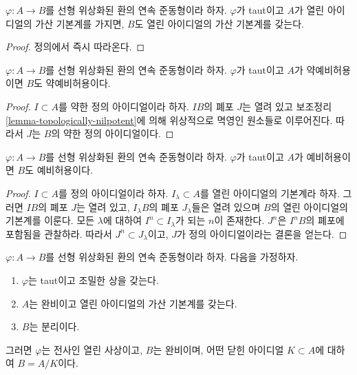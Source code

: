 \begin{lemma}
\label{lemma-taut-ascent-countable}
$\varphi : A \to B$를 선형 위상화된 환의 연속 준동형이라 하자.
$\varphi$가 taut이고 $A$가 열린 아이디얼의 가산 기본계를 가지면,
$B$도 열린 아이디얼의 가산 기본계를 갖는다.
\end{lemma}

\begin{proof}
정의에서 즉시 따라온다.
\end{proof}

\begin{lemma}
\label{lemma-taut-ascent-weakly-admissible}
$\varphi : A \to B$를 선형 위상화된 환의 연속 준동형이라 하자.
$\varphi$가 taut이고 $A$가 약예비허용이면 $B$도 약예비허용이다.
\end{lemma}

\begin{proof}
$I \subset A$를 약한 정의 아이디얼이라 하자. $IB$의 폐포 $J$는
열려 있고 보조정리 \ref{lemma-topologically-nilpotent}에 의해
위상적으로 멱영인 원소들로 이루어진다. 따라서 $J$는 $B$의 약한
정의 아이디얼이다.
\end{proof}

\begin{lemma}
\label{lemma-taut-ascent-admissible}
$\varphi : A \to B$를 선형 위상화된 환의 연속 준동형이라 하자.
$\varphi$가 taut이고 $A$가 예비허용이면 $B$도 예비허용이다.
\end{lemma}

\begin{proof}
$I \subset A$를 정의 아이디얼이라 하자. $I_\lambda \subset A$를
열린 아이디얼의 기본계라 하자. 그러면 $IB$의 폐포 $J$는 열려 있고,
$I_\lambda B$의 폐포 $J_\lambda$들은 열려 있으며 $B$의 열린
아이디얼의 기본계를 이룬다. 모든 $\lambda$에 대하여
$I^n \subset I_\lambda$가 되는 $n$이 존재한다. $J^n$은 $I^nB$의
폐포에 포함됨을 관찰하라. 따라서 $J^n \subset J_\lambda$이고,
$J$가 정의 아이디얼이라는 결론을 얻는다.
\end{proof}

\begin{lemma}
\label{lemma-dense-image-surjective}
$\varphi : A \to B$를 선형 위상화된 환의 연속 준동형이라 하자.
다음을 가정하자.
\begin{enumerate}
\item $\varphi$는 taut이고 조밀한 상을 갖는다.
\item $A$는 완비이고 열린 아이디얼의 가산 기본계를 갖는다.
\item $B$는 분리이다.
\end{enumerate}
그러면 $\varphi$는 전사인 열린 사상이고, $B$는 완비이며,
어떤 닫힌 아이디얼 $K \subset A$에 대하여 $B = A/K$이다.
\end{lemma}

